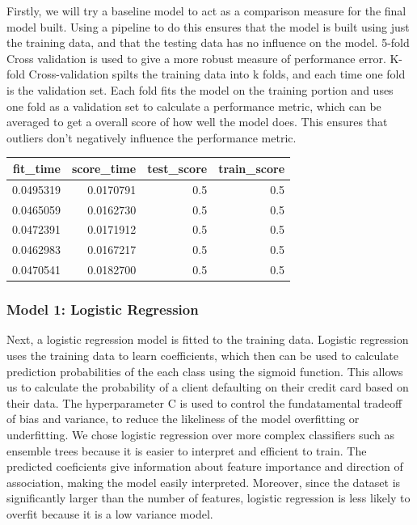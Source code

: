 \documentclass[
]{article}
\begin{document}
Firstly, we will try a baseline model to act as a comparison measure for
the final model built. Using a pipeline to do this ensures that the
model is built using just the training data, and that the testing data
has no influence on the model. 5-fold Cross validation is used to give a
more robust measure of performance error. K-fold Cross-validation spilts
the training data into k folds, and each time one fold is the validation
set. Each fold fits the model on the training portion and uses one fold
as a validation set to calculate a performance metric, which can be
averaged to get a overall score of how well the model does. This ensures
that outliers don't negatively influence the performance metric.

\begin{longtable}[]{@{}rrrr@{}}
\toprule
fit\_time & score\_time & test\_score & train\_score \\
\midrule
\endhead
0.0495319 & 0.0170791 & 0.5 & 0.5 \\
0.0465059 & 0.0162730 & 0.5 & 0.5 \\
0.0472391 & 0.0171912 & 0.5 & 0.5 \\
0.0462983 & 0.0167217 & 0.5 & 0.5 \\
0.0470541 & 0.0182700 & 0.5 & 0.5 \\
\bottomrule
\end{longtable}

\hypertarget{model-1-logistic-regression}{%
\subsubsection{Model 1: Logistic
Regression}\label{model-1-logistic-regression}}

Next, a logistic regression model is fitted to the training data.
Logistic regression uses the training data to learn coefficients, which
then can be used to calculate prediction probabilities of the each class
using the sigmoid function. This allows us to calculate the probability
of a client defaulting on their credit card based on their data. The
hyperparameter C is used to control the fundatamental tradeoff of bias
and variance, to reduce the likeliness of the model overfitting or
underfitting. We chose logistic regression over more complex classifiers
such as ensemble trees because it is easier to interpret and efficient
to train. The predicted coeficients give information about feature
importance and direction of association, making the model easily
interpreted. Moreover, since the dataset is significantly larger than
the number of features, logistic regression is less likely to overfit
because it is a low variance model.
\end{document}

